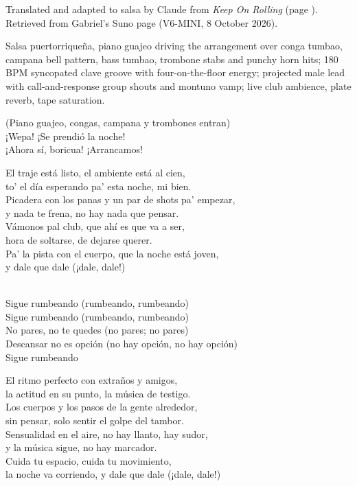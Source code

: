 
\begin{notes}
Translated and adapted to salsa by Claude from \emph{Keep On Rolling} (page \pageref{sec:keep-on-rolling}). Retrieved from Gabriel's Suno page (V6-MINI, 8 October 2026).
\end{notes}
\begin{style}
Salsa puertorriqueña, piano guajeo driving the arrangement over conga tumbao, campana bell pattern, bass tumbao, trombone stabs and punchy horn hits; 180 BPM syncopated clave groove with four-on-the-floor energy; projected male lead with call-and-response group shouts and montuno vamp; live club ambience, plate reverb, tape saturation.
\end{style}
\begin{lyrics}
(Piano guajeo, congas, campana y trombones entran)\\
¡Wepa! ¡Se prendió la noche!\\
¡Ahora sí, boricua! ¡Arrancamos!

El traje está listo, el ambiente está al cien,\\
to' el día esperando pa' esta noche, mi bien.\\
Picadera con los panas y un par de shots pa' empezar,\\
y nada te frena, no hay nada que pensar.\\
Vámonos pal club, que ahí es que va a ser,\\
hora de soltarse, de dejarse querer.\\
Pa' la pista con el cuerpo, que la noche está joven,\\
y dale que dale (¡dale, dale!)

\\
Sigue rumbeando (rumbeando, rumbeando)\\
Sigue rumbeando (rumbeando, rumbeando)\\
No pares, no te quedes (no pares; no pares)\\
Descansar no es opción (no hay opción, no hay opción)\\
Sigue rumbeando

El ritmo perfecto con extraños y amigos,\\
la actitud en su punto, la música de testigo.\\
Los cuerpos y los pasos de la gente alrededor,\\
sin pensar, solo sentir el golpe del tambor.\\
Sensualidad en el aire, no hay llanto, hay sudor,\\
y la música sigue, no hay marcador.\\
Cuida tu espacio, cuida tu movimiento,\\
la noche va corriendo, y dale que dale (¡dale, dale!)


\end{lyrics}
